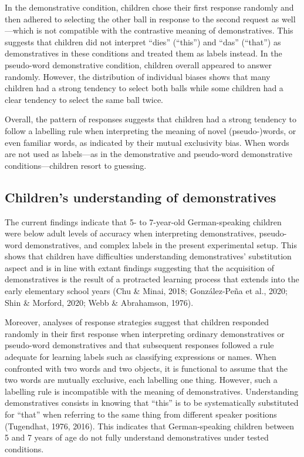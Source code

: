 \documentclass[
  man,floatsintext]{apa6}
\begin{document}
In the demonstrative condition, children chose their first response randomly and then adhered to selecting the other ball in response to the second request as well---which is not compatible with the contrastive meaning of demonstratives. This suggests that children did not interpret ``dies'' (``this'') and ``das'' (``that'') as demonstratives in these conditions and treated them as labels instead. In the pseudo-word demonstrative condition, children overall appeared to answer randomly. However, the distribution of individual biases shows that many children had a strong tendency to select both balls while some children had a clear tendency to select the same ball twice.

Overall, the pattern of responses suggests that children had a strong tendency to follow a labelling rule when interpreting the meaning of novel (pseudo-)words, or even familiar words, as indicated by their mutual exclusivity bias. When words are not used as labels---as in the demonstrative and pseudo-word demonstrative conditions---children resort to guessing.

\subsection{Children's understanding of demonstratives}\label{childrens-understanding-of-demonstratives}

The current findings indicate that 5- to 7-year-old German-speaking children were below adult levels of accuracy when interpreting demonstratives, pseudo-word demonstratives, and complex labels in the present experimental setup. This shows that children have difficulties understanding demonstratives' substitution aspect and is in line with extant findings suggesting that the acquisition of demonstratives is the result of a protracted learning process that extends into the early elementary school years (Chu \& Minai, 2018; González-Peña et al., 2020; Shin \& Morford, 2020; Webb \& Abrahamson, 1976).

Moreover, analyses of response strategies suggest that children responded randomly in their first response when interpreting ordinary demonstratives or pseudo-word demonstratives and that subsequent responses followed a rule adequate for learning labels such as classifying expressions or names. When confronted with two words and two objects, it is functional to assume that the two words are mutually exclusive, each labelling one thing. However, such a labelling rule is incompatible with the meaning of demonstratives. Understanding demonstratives consists in knowing that ``this'' is to be systematically substituted for ``that'' when referring to the same thing from different speaker positions (Tugendhat, 1976, 2016). This indicates that German-speaking children between 5 and 7 years of age do not fully understand demonstratives under tested conditions.
\end{document}
